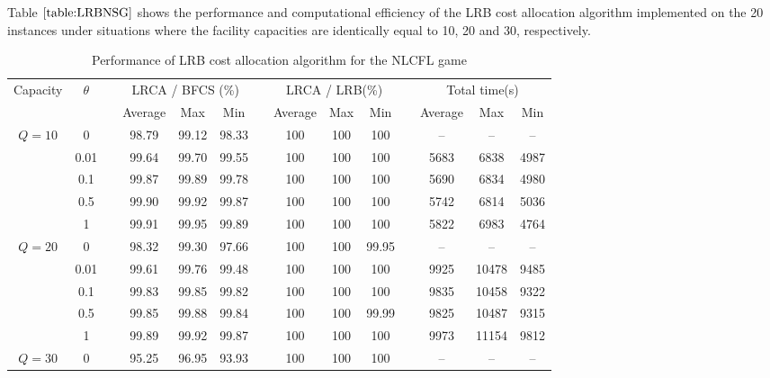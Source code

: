 \documentclass[ijoc,nonblindrev]{informs3} %
\begin{document}
Table $\ref{table:LRBNSG}$ shows the performance and computational efficiency of the LRB cost allocation algorithm implemented on the 20 instances under situations where the facility capacities are identically equal to 10, 20 and 30, respectively.
\begin{table}[H]
\vspace{-2mm}
\centering
\tabcolsep=6pt
\small
\renewcommand\arraystretch{1.4}
\caption{\label{table:LRBNSG}Performance of LRB cost allocation algorithm for the NLCFL game}
\begin{tabular}[!h]{c c c c c c c c c c c c c c}
\hline
\multirow{2}{*}{Capacity} &\multirow{2}{*}{$\theta$} &\multicolumn{1}{c}{} & \multicolumn{3}{c}{LRCA / BFCS (\%)} &\multicolumn{1}{c}{} & \multicolumn{3}{c}{LRCA / LRB(\%)}  &\multicolumn{1}{c}{} & \multicolumn{3}{c}{Total time(s)}\\
\cline{4-6}
\cline{8-10}
\cline{12-14}
& & & Average & Max &Min	& & Average & Max &Min & & Average & Max &Min\\
\hline
\multirow{5}{*}{$Q=10$}
&0  &  &98.79	&99.12	&98.33	&	&100	&100	&100	&	&--	&--	&--\\

&0.01  &  &99.64	&99.70	&99.55	&	&100	&100	&100	&	&5683	&6838	&4987\\

&0.1  &  &99.87	&99.89	&99.78	&	&100	&100	&100	&	&5690	&6834	&4980\\

&0.5  &  &99.90	&99.92	&99.87	&	&100	&100	&100	&	&5742	&6814	&5036\\

&1  &  &99.91	&99.95	&99.89	&	&100	&100	&100	&	&5822	&6983	&4764\\
\hline
\multirow{5}{*}{$Q=20$}
&0  &  &98.32	&99.30	&97.66	&	&100	&100	&99.95	&	&--	&--	&--\\

&0.01  &  &99.61	&99.76	&99.48	&	&100	&100	&100	&	&9925	&10478	&9485\\

&0.1  &  &99.83	&99.85	&99.82	&	&100	&100	&100	&	&9835	&10458	&9322\\

&0.5  &  &99.85	&99.88	&99.84	&	&100	&100	&99.99	&	&9825	&10487	&9315\\

&1  &  &99.89	&99.92	&99.87	&	&100	&100	&100	&	&9973	&11154	&9812\\
\hline
\multirow{5}{*}{$Q=30$}
&0  &  &95.25	&96.95	&93.93	&	&100	&100	&100	&	&--	&--	&--\\


\end{tabular}
\end{table}
\end{document}
